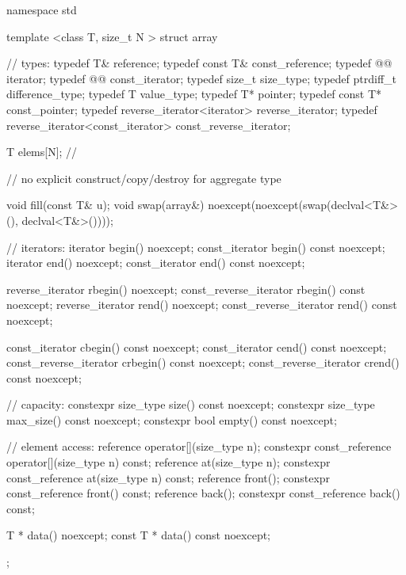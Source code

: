 \begin{codeblock}
namespace std {
  template <class T, size_t N >
  struct array {
    //  types:
    typedef T&                                    reference;
    typedef const T&                              const_reference;
    typedef @@                iterator;
    typedef @@                const_iterator;
    typedef size_t                                size_type;
    typedef ptrdiff_t                             difference_type;
    typedef T                                     value_type;
    typedef T*                                    pointer;
    typedef const T*                              const_pointer;
    typedef reverse_iterator<iterator>            reverse_iterator;
    typedef reverse_iterator<const_iterator>      const_reverse_iterator;

    T       elems[N];           // \expos

    // no explicit construct/copy/destroy for aggregate type

    void fill(const T& u);
    void swap(array&) noexcept(noexcept(swap(declval<T&>(), declval<T&>())));

    // iterators:
    iterator               begin() noexcept;
    const_iterator         begin() const noexcept;
    iterator               end() noexcept;
    const_iterator         end() const noexcept;

    reverse_iterator       rbegin() noexcept;
    const_reverse_iterator rbegin() const noexcept;
    reverse_iterator       rend() noexcept;
    const_reverse_iterator rend() const noexcept;

    const_iterator         cbegin() const noexcept;
    const_iterator         cend() const noexcept;
    const_reverse_iterator crbegin() const noexcept;
    const_reverse_iterator crend() const noexcept;

    // capacity:
    constexpr size_type size() const noexcept;
    constexpr size_type max_size() const noexcept;
    constexpr bool      empty() const noexcept;

    // element access:
    reference                 operator[](size_type n);
    constexpr const_reference operator[](size_type n) const;
    reference                 at(size_type n);
    constexpr const_reference at(size_type n) const;
    reference                 front();
    constexpr const_reference front() const;
    reference                 back();
    constexpr const_reference back() const;

    T *       data() noexcept;
    const T * data() const noexcept;
  };
}
\end{codeblock}

